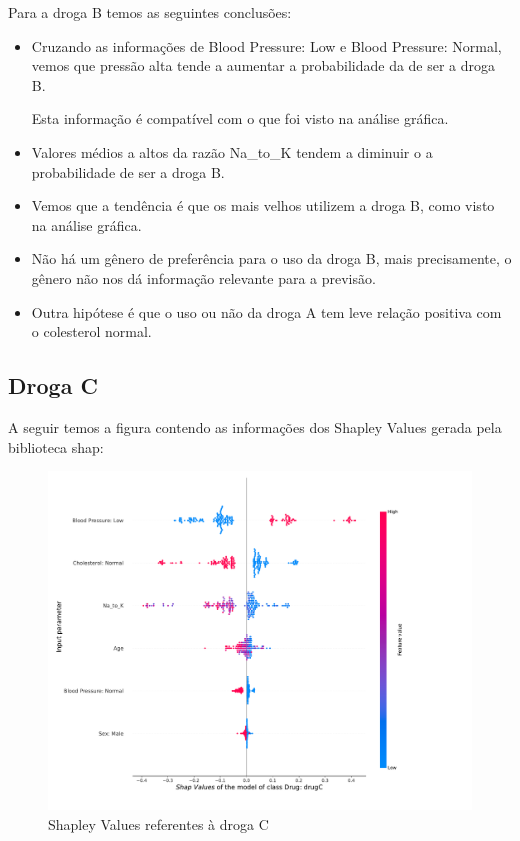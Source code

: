 \documentclass[12pt,a4paper]{article}
\theoremstyle{definition}
\theoremstyle{theoremdd}
\begin{document}
Para a droga B temos as seguintes conclusões:

\begin{itemize}
\item Cruzando as informações de Blood Pressure: Low e Blood Pressure: Normal, vemos que pressão alta tende a aumentar a probabilidade da de ser a droga B.

Esta informação é compatível com o que foi visto na análise gráfica.

\item Valores médios a altos da razão Na\_to\_K tendem a diminuir o a probabilidade de ser a droga B.

\item Vemos que a tendência é que os mais velhos utilizem a droga B, como visto na análise gráfica.

\item Não há um gênero de preferência para o uso da droga B, mais precisamente, o gênero não nos dá informação relevante para a previsão.

\item Outra hipótese é que o uso ou não da droga A tem leve relação positiva com o colesterol normal.
\end{itemize}


\subsection{Droga C}
A seguir temos a figura contendo as informações dos Shapley Values gerada pela biblioteca shap:
\begin{center}
\begin{figure}[H]
	\centering
	\includegraphics[scale=.40]{shap_drugC.pdf}
	\caption{Shapley Values referentes à droga C}
	\label{fig:05}
\end{figure}
\end{center}
\end{document}
